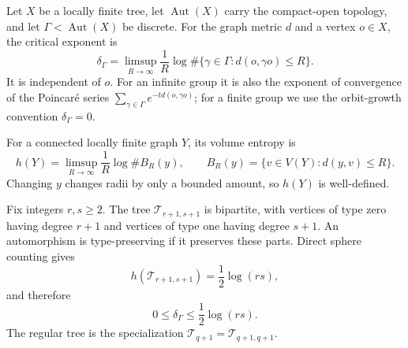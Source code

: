 \documentclass[11pt]{amsart}
\theoremstyle{plain}
\theoremstyle{definition}
\theoremstyle{remark}
\newcommand{\T}{\mathcal T}
\newcommand{\Aut}{\operatorname{Aut}}
\begin{document}
Let \(X\) be a locally finite tree, let \(\Aut(X)\) carry the compact-open
topology, and let \(\Gamma<\Aut(X)\) be discrete.  For the graph metric \(d\)
and a vertex \(o\in X\), the critical exponent is
\begin{equation}\label{eq:critical-exponent-intro}
  \delta_\Gamma
  =\limsup_{R\to\infty}\frac1R
    \log\#\{\gamma\in\Gamma:d(o,\gamma o)\leq R\}.
\end{equation}
It is independent of \(o\).  For an infinite group it is also the exponent
of convergence of the Poincar\'e series
\(\sum_{\gamma\in\Gamma}e^{-t d(o,\gamma o)}\); for a finite group we use
the orbit-growth convention \(\delta_\Gamma=0\).

For a connected locally finite graph \(Y\), its volume entropy is
\begin{equation}\label{eq:volume-entropy-intro}
  h(Y)
  =\limsup_{R\to\infty}\frac1R\log\#B_R(y),
  \qquad B_R(y)=\{v\in V(Y):d(y,v)\leq R\}.
\end{equation}
Changing \(y\) changes radii by only a bounded amount, so \(h(Y)\) is
well-defined.

Fix integers \(r,s\geq2\).  The tree \(\T_{r+1,s+1}\) is bipartite, with
vertices of type zero having degree \(r+1\) and vertices of type one having
degree \(s+1\).  An automorphism is type-preserving if it preserves these
parts.  Direct sphere counting gives
\[
  h(\T_{r+1,s+1})=\frac12\log(rs),
\]
and therefore
\begin{equation}\label{eq:intro-biregular-bound}
  0\leq\delta_\Gamma\leq\frac12\log(rs).
\end{equation}
The regular tree is the specialization
\(\T_{q+1}=\T_{q+1,q+1}\).
\end{document}
